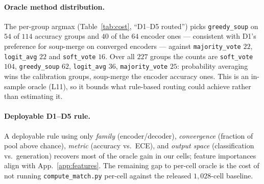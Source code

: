 \documentclass[11pt]{article}
\begin{document}
\paragraph{Oracle method distribution.} The per-group argmax (Table~\ref{tab:cost}, ``D1--D5 routed'') picks \texttt{greedy\_soup} on $54$ of $114$ accuracy groups and $40$ of the $64$ encoder ones --- consistent with D1's preference for soup-merge on converged encoders --- against \texttt{majority\_vote} $22$, \texttt{logit\_avg} $22$ and \texttt{soft\_vote} $16$. Over all $227$ groups the counts are \texttt{soft\_vote} $104$, \texttt{greedy\_soup} $62$, \texttt{logit\_avg} $36$, \texttt{majority\_vote} $25$: probability averaging wins the calibration groups, soup-merge the encoder accuracy ones. This is an in-sample oracle (L11), so it bounds what rule-based routing could achieve rather than estimating it.

\paragraph{Deployable D1--D5 rule.} A deployable rule using only \emph{family} (encoder/decoder), \emph{convergence} (fraction of pool above chance), \emph{metric} (accuracy vs.\ ECE), and \emph{output space} (classification vs.\ generation) recovers most of the oracle gain in our cells; feature importances align with App.~\ref{app:features}. The remaining gap to per-cell oracle is the cost of not running \texttt{compute\_\allowbreak match.\allowbreak py} per-cell against the released $1{,}028$-cell baseline.
\end{document}
